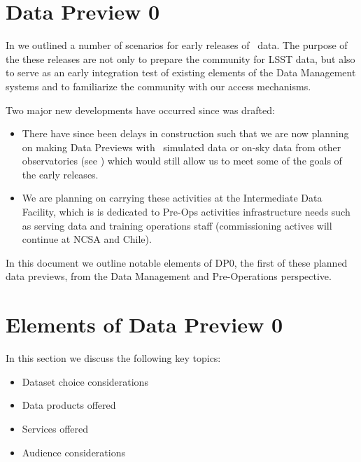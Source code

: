 \section{Data Preview 0}\label{sec:dp0}

In  we outlined a number of scenarios for early releases of \RO~data. The purpose of the these releases are not only to prepare the community for LSST data, but also to serve as an early integration test of existing elements of the Data Management systems and to familiarize the community with our access mechanisms.

Two major new developments have occurred since  was drafted:

\begin{itemize}

\item There have since been delays in construction such that we are now planning on making Data Previews with \RO~simulated data or on-sky data from other observatories (see ) which would still allow us to meet some of the goals of the early releases.

\item We are planning on carrying these activities at the Intermediate Data Facility, which is is dedicated to Pre-Ops activities infrastructure needs such as serving data and training operations staff (commissioning actives will continue at NCSA and Chile).

\end{itemize}

In this document we outline notable elements of DP0, the first of these planned data previews, from the Data Management and Pre-Operations perspective.

\section{Elements of Data Preview 0}

In this section we discuss the following key topics:

\begin{itemize}

\item Dataset choice considerations

\item Data products offered

\item Services offered

\item Audience considerations

\end{itemize}

